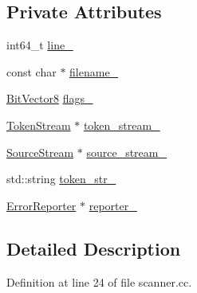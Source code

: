 \subsection*{Private Attributes}
\begin{DoxyCompactItemize}
\item 
int64\_\-t \hyperlink{classmocha_1_1_scanner_1_1_internal_scanner_a4373a31066ba8f0cf4b7ca596b5c7664}{line\_\-}
\item 
const char $\ast$ \hyperlink{classmocha_1_1_scanner_1_1_internal_scanner_a94675ebd54efd1307a5e1adde23f6085}{filename\_\-}
\item 
\hyperlink{classmocha_1_1_bit_vector}{BitVector8} \hyperlink{classmocha_1_1_scanner_1_1_internal_scanner_a3ddb9e89c7258875af43e6e0121c5f50}{flags\_\-}
\item 
\hyperlink{classmocha_1_1_token_stream}{TokenStream} $\ast$ \hyperlink{classmocha_1_1_scanner_1_1_internal_scanner_a61da9ebc53fe5bc26886f8cebb11fbb6}{token\_\-stream\_\-}
\item 
\hyperlink{classmocha_1_1_source_stream}{SourceStream} $\ast$ \hyperlink{classmocha_1_1_scanner_1_1_internal_scanner_a73ee193d140adb5dc6b16b636b70b31b}{source\_\-stream\_\-}
\item 
std::string \hyperlink{classmocha_1_1_scanner_1_1_internal_scanner_a2d7ca3e8ec12f70efe038c36461dbb98}{token\_\-str\_\-}
\item 
\hyperlink{classmocha_1_1_error_reporter}{ErrorReporter} $\ast$ \hyperlink{classmocha_1_1_scanner_1_1_internal_scanner_a0c242f839db4a29652540b262986f048}{reporter\_\-}
\end{DoxyCompactItemize}


\subsection{Detailed Description}


Definition at line 24 of file scanner.cc.



